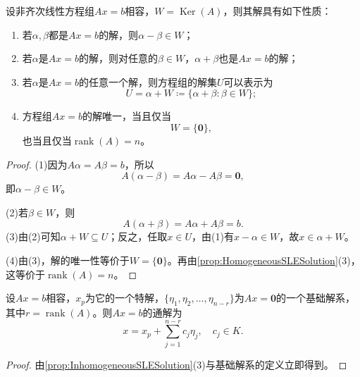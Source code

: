 \begin{property}\label{prop:InhomogeneousSLESolution}
	设非齐次线性方程组$Ax=b$相容，$W=\operatorname{Ker}(A)$，则其解具有如下性质：
	\begin{enumerate}
		\item 若$\alpha,\beta$都是$Ax=b$的解，则$\alpha-\beta\in W$；
		\item 若$\alpha$是$Ax=b$的解，则对任意的$\beta\in W$，$\alpha+\beta$也是$Ax=b$的解；
		\item 若$\alpha$是$Ax=b$的任意一个解，则方程组的解集$U$可以表示为
		\begin{equation*}
			U=\alpha+W
			\coloneq\{\alpha+\beta:\beta\in W\};
		\end{equation*}
		\item 方程组$Ax=b$的解唯一，当且仅当
		\begin{equation*}
			W=\{\mathbf{0}\},
		\end{equation*}
		也当且仅当$\operatorname{rank}(A)=n$。
	\end{enumerate}
\end{property}
\begin{proof}
	(1)因为$A\alpha=A\beta=b$，所以
	\begin{equation*}
		A(\alpha-\beta)=A\alpha-A\beta=\mathbf{0},
	\end{equation*}
	即$\alpha-\beta\in W$。\par
	(2)若$\beta\in W$，则
	\begin{equation*}
		A(\alpha+\beta)=A\alpha+A\beta=b.
	\end{equation*}
	(3)由(2)可知$\alpha+W\subseteq U$；反之，任取$x\in U$，由(1)有$x-\alpha\in W$，故$x\in\alpha+W$。\par
	(4)由(3)，解的唯一性等价于$W=\{\mathbf{0}\}$。再由\cref{prop:HomogeneousSLESolution}(3)，这等价于$\operatorname{rank}(A)=n$。
\end{proof}

\begin{corollary}\label{cor:SLEGeneralSolution}
	设$Ax=b$相容，$x_p$为它的一个特解，$\{\eta_1,\eta_2,\dots,\eta_{n-r}\}$为$Ax=\mathbf{0}$的一个基础解系，其中$r=\operatorname{rank}(A)$。则$Ax=b$的通解为
	\begin{equation*}
		x=x_p+\sum_{j=1}^{n-r}c_j\eta_j,\quad c_j\in K.
	\end{equation*}
\end{corollary}
\begin{proof}
	由\cref{prop:InhomogeneousSLESolution}(3)与基础解系的定义立即得到。
\end{proof}


